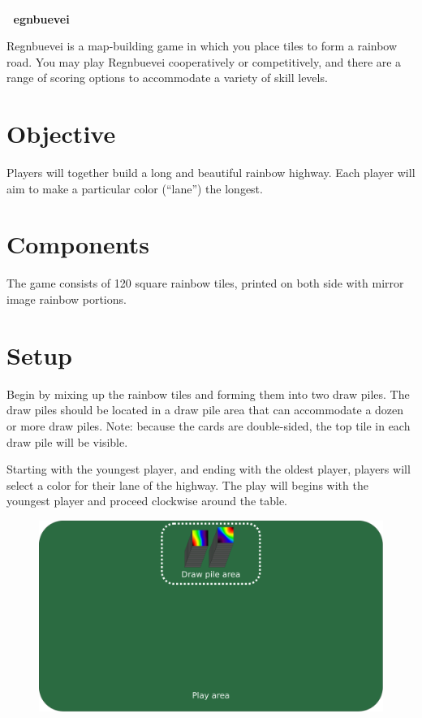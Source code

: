 \documentclass[twocolumn, 11pt]{article}
\begin{document}
{
  \textcolor{white}{.}\\
  \textcolor{white}{.}\Huge \bf\hspace{0.3em} egnbuevei
}

\vspace{1.7em}\noindent
Regnbuevei is a map-building game in which you place tiles to form a rainbow road.  You may play Regnbuevei cooperatively or competitively, and there are a range of scoring options to accommodate a variety of skill levels.

\section*{Objective}

Players will together build a long and beautiful rainbow highway.
Each player will aim to make a particular color (``lane'') the
longest.
\section*{Components}
The game consists of 120 square rainbow tiles, printed on both side with mirror image rainbow portions.

\section*{Setup}

Begin by mixing up the rainbow tiles and forming them into two draw
piles. The draw piles should be located in a draw pile area that can
accommodate a dozen or more draw piles.  Note: because the cards are
double-sided, the top tile in each draw pile will be visible.

Starting with the youngest player, and ending with the oldest player,
players will select a color for their lane of the highway.  The play
will begins with the youngest player and proceed clockwise around the
table.
\begin{figure}[h]
  \includegraphics[width=\columnwidth]{draw-piles}
\end{figure}
\end{document}
